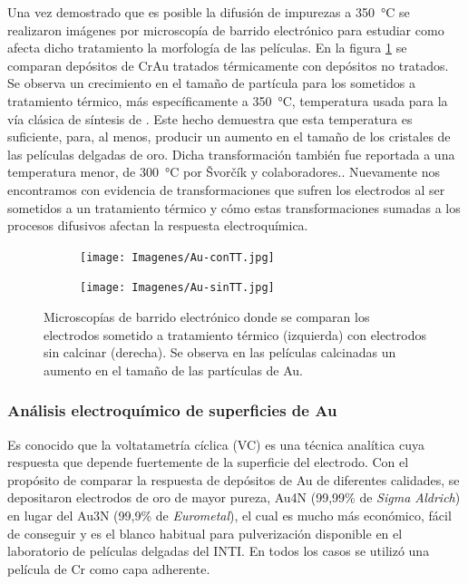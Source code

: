 {{			 Una vez demostrado que es posible la difusión de impurezas a \SI{350}{\celsius} se realizaron imágenes por microscopía de barrido electrónico para estudiar como afecta dicho tratamiento la morfología de las películas. En la figura \ref{fig:Au_compTT} se comparan depósitos de Cr\textbar Au tratados térmicamente con depósitos no tratados. Se observa un crecimiento en el tamaño de partícula para los sometidos a tratamiento térmico, más específicamente a \SI{350}{\celsius}, temperatura usada para la vía clásica de síntesis de \pdm. Este hecho demuestra que esta temperatura es suficiente, para, al menos, producir un aumento en el tamaño de los cristales de las películas delgadas de oro. Dicha transformación también fue reportada a una temperatura menor, de \SI{300}{\celsius} por \v{S}vor\v{c}\'ik y colaboradores.}\cite{Svorcik2010}. Nuevamente nos encontramos con evidencia de transformaciones que sufren los electrodos al ser sometidos a un tratamiento térmico y cómo estas transformaciones sumadas a los procesos difusivos afectan la respuesta electroquímica.

			 		\begin{figure}[th]
		 	   	    \begin{subfigure}[t]{0.49\textwidth}
			       	\texttt{[image: Imagenes/Au-conTT.jpg]}
			   		\end{subfigure}
			   		\begin{subfigure}[t]{0.49\textwidth}
			   	    \texttt{[image: Imagenes/Au-sinTT.jpg]}
			   		\end{subfigure}
					 \caption[Microscopía comparativa electrodos Au]{Microscopías de barrido electrónico donde se comparan los electrodos sometido a tratamiento térmico (izquierda) con electrodos sin calcinar (derecha). Se observa en las películas calcinadas un aumento en el tamaño de las partículas de Au.}
					 \label{fig:Au_compTT}	
				     \end{figure}
	
		\subsubsection{Análisis electroquímico de superficies de Au}

			Es conocido que la voltatametría cíclica (VC) es una técnica analítica cuya respuesta que depende fuertemente de la superficie del electrodo.\cite{Wi2000,Pumera2007,Gewirth2004,Villullas2000} Con el propósito de comparar la respuesta de depósitos de Au de diferentes calidades, se depositaron electrodos de oro de mayor pureza, Au4N (99,99\% de \textit{Sigma Aldrich}) en lugar del Au3N (99,9\% de \textit{Eurometal}), el cual es mucho más económico, fácil de conseguir y es el blanco habitual para pulverización disponible en el laboratorio de películas delgadas del INTI. En todos los casos se utilizó una película de Cr como capa adherente.

}
